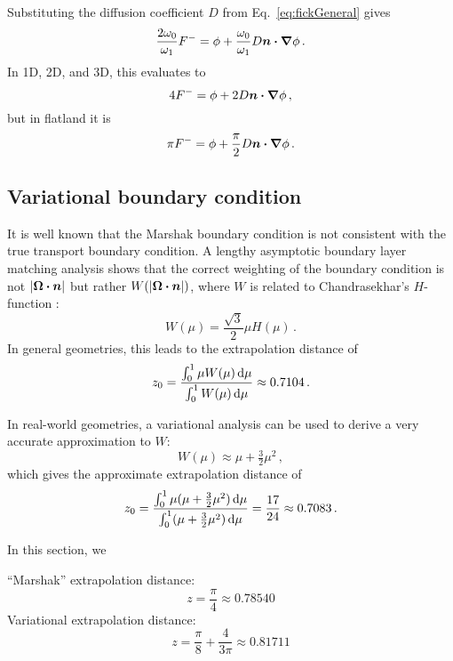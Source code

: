 Substituting the diffusion coefficient $D$ from Eq.~\eqref{eq:fickGeneral} gives
\begin{equation*}
\frac{2\omega_0}{\omega_1} F^{-}
= \phi + \frac{\omega_0}{\omega_1} D \bm{n} \bm{\cdot} \bm{\nabla} \phi\,.
\end{equation*}
In 1D, 2D, and 3D, this evaluates to
\begin{equation*}
4 F^{-}
= \phi + 2 D \bm{n} \bm{\cdot} \bm{\nabla} \phi\,,
\end{equation*}
but in flatland it is
\begin{equation*}
\pi F^{-}
= \phi + \frac{\pi}{2} D \bm{n} \bm{\cdot} \bm{\nabla} \phi\,.
\end{equation*}

\subsection{Variational boundary condition} \label{sec:varBndy}
It is well known that the Marshak boundary condition is not consistent with the
true transport boundary condition. A lengthy asymptotic boundary layer
matching analysis \cite{Hab1975} shows that the correct weighting of the
boundary condition is not $\left| \bm{\Omega}\bm{\cdot}\bm{n} \right|$ but rather
$W(\left| \bm{\Omega}\bm{\cdot}\bm{n} \right|)$, where $W$ is related to Chandrasekhar's
$H$-function \cite{Cha1960}:
\begin{equation} \label{eq:chandraW}
  W(\mu) = \frac{\sqrt{3}}{2} \mu H(\mu) \,.
\end{equation}
In general geometries, this leads to the extrapolation distance of
\begin{align*}
  z_0 = \frac{\int_{0}^{1} \mu W(\mu) \mathop{}\!\mathrm{d} \mu}{\int_{0}^{1} W(\mu) \mathop{}\!\mathrm{d}
  \mu} \approx 0.7104\,.
\end{align*}

In real-world geometries, a variational analysis \cite{Mal1991} can be used to
derive a very accurate approximation to $W$:
\begin{equation*}
W(\mu) \approx \mu + \tfrac{3}{2} \mu^2 \,,
\end{equation*}
which gives the approximate extrapolation distance of
\begin{equation*}
  z_0 = \frac{\int_{0}^{1} \mu (\mu + \tfrac{3}{2} \mu^2 ) \mathop{}\!\mathrm{d}
  \mu}{\int_{0}^{1} (\mu + \tfrac{3}{2} \mu^2 ) \mathop{}\!\mathrm{d} \mu} 
  = \frac{17}{24} \approx 0.7083 \,.
\end{equation*}

In this section, we 

``Marshak'' extrapolation distance:
\begin{equation*}
  z = \frac{\pi}{4} \approx 0.78540
\end{equation*}
Variational extrapolation distance:
\begin{equation*}
  z = \frac{\pi}{8} + \frac{4}{3\pi} \approx 0.81711
\end{equation*}


